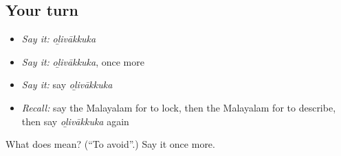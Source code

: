 \subsection*{Your turn}
\begin{itemize}
\raggedright
  \item \emph{Say it:} \emph{oḻivākkuka}
  \item \emph{Say it:} \emph{oḻivākkuka}, once more
  \item \emph{Say it:} say \emph{oḻivākkuka}
  \item \emph{Recall:} say the Malayalam for to lock, then the Malayalam for to describe, then say \emph{oḻivākkuka} again
\end{itemize}

\begin{tcolorbox}[breakable,colback=teal!4,colframe=teal!35!black,title={Before you move on}]
What does  mean? (\textquotedblleft{}To avoid\textquotedblright{}.) Say it once more.
\end{tcolorbox}
